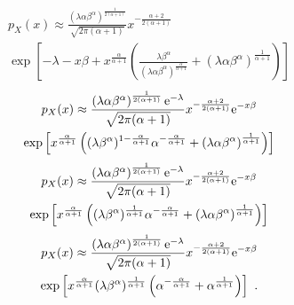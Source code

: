 \begin{multline*}
  p_X(x)\approx
  \frac{
    \left(
      \lambda\alpha\beta^\alpha
    \right)^{\frac{1}{2(\alpha+1)}}
  }
  {
    \sqrt{2\pi(\alpha+1)}}x^{-\frac{\alpha+2}{2(\alpha+1)}
  } 
  \\
  \exp\left[
    -\lambda
    -x\beta
    +x^{\frac{\alpha}{\alpha+1}}
    \left(
      \frac{
        \lambda\beta^\alpha
      }
      {
        \left(\lambda\alpha\beta^\alpha\right)^{\frac{\alpha}{\alpha+1}}
      }
      +
      \left(
        \lambda\alpha\beta^\alpha
      \right)^{\frac{1}{\alpha+1}}
    \right)
  \right]
\end{multline*}
\begin{multline*}
  p_X(x)\approx
  \frac{
    \left(
      \lambda\alpha\beta^\alpha
    \right)^{\frac{1}{2(\alpha+1)}}\mathrm{e}^{-\lambda}
  }
  {
    \sqrt{2\pi(\alpha+1)}}x^{-\frac{\alpha+2}{2(\alpha+1)}
  }
  \mathrm{e}^{-x\beta}
  \\
  \exp\left[
    x^{\frac{\alpha}{\alpha+1}}
    \left(
      (\lambda\beta^\alpha)^{1-\frac{\alpha}{\alpha+1}}\alpha^{-\frac{\alpha}{\alpha+1}}
      +
      \left(
        \lambda\alpha\beta^\alpha
      \right)^{\frac{1}{\alpha+1}}
    \right)
  \right]
\end{multline*}
\begin{multline*}
  p_X(x)\approx
  \frac{
    \left(\lambda\alpha\beta^\alpha\right)^{\frac{1}{2(\alpha+1)}}\mathrm{e}^{-\lambda}
  }
  {
    \sqrt{2\pi(\alpha+1)}
  }
  x^{-\frac{\alpha+2}{2(\alpha+1)}}\mathrm{e}^{-x\beta}
  \\
  \exp\left[
    x^{\frac{\alpha}{\alpha+1}}
    \left(
      (\lambda\beta^\alpha)^{\frac{1}{\alpha+1}}
      \alpha^{-\frac{\alpha}{\alpha+1}}
      +
      \left(\lambda\alpha\beta^\alpha\right)^{\frac{1}{\alpha+1}}
    \right)
  \right]
\end{multline*}
\begin{multline*}
  p_X(x)\approx
  \frac{
    \left(\lambda\alpha\beta^\alpha\right)^{\frac{1}{2(\alpha+1)}}\mathrm{e}^{-\lambda}
  }
  {
    \sqrt{2\pi(\alpha+1)}
  }
  x^{-\frac{\alpha+2}{2(\alpha+1)}}\mathrm{e}^{-x\beta}
  \\
  \exp\left[
    x^{\frac{\alpha}{\alpha+1}}(\lambda\beta^\alpha)^{\frac{1}{\alpha+1}}
    \left(
      \alpha^{-\frac{\alpha}{\alpha+1}}+\alpha^{\frac{1}{\alpha+1}}
    \right)
  \right]
  \ .
\end{multline*}

